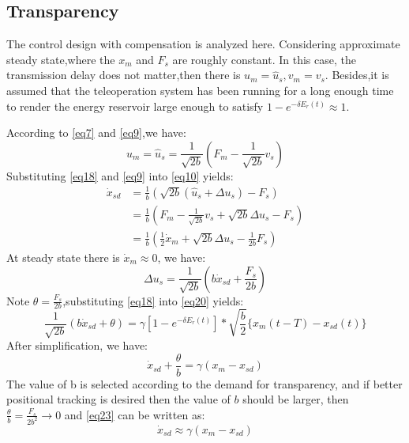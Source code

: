 \subsection{Transparency}
The control design with compensation is analyzed here.
Considering approximate steady state,where the $x_m$ and $F_s$ are roughly constant.
In this case, the transmission delay does not matter,then there is ${{u}_{m}}={{\hat{u}}_{s}},{{v}_{m}}={{v}_{s}}$.
Besides,it is assumed that the teleoperation system has been running for a long enough time
to render the energy reservoir large enough to satisfy $1-{{e}^{-\delta {{E}_{r}}(t)}}\approx 1$.
\par According to \eqref{eq7} and \eqref{eq9},we have:
\begin{equation}
    {{u}_{m}}={{\hat{u}}_{s}}=\frac{1}{\sqrt{2b}}
    \left( {{F}_{m}}-\frac{1}{\sqrt{2b}}{{v}_{s}} \right)
    \label{eq21}
\end{equation}
Substituting \eqref{eq18} and \eqref{eq9} into \eqref{eq10} yields:
$$\begin{aligned}
        \dot{x}_{sd} & =\frac{1}{b}(\sqrt{2b}(\hat{u}_{s}+\Delta u_{s})-F_{s})                      \\
                     & =\frac{1}{b}(F_{m}-\frac{1}{\sqrt{2b}}v_{s}+\sqrt{2b}\Delta u_{s}-F_{s})     \\
                     & =\frac{1}{b}(\frac{1}{2}\dot{x}_{m}+\sqrt{2b}\Delta u_{s}-\frac{1}{2b}F_{s})
    \end{aligned}$$
At steady state there is $\dot x_m \approx 0$, we have:
\begin{equation}
    \Delta {{u}_{s}}=\frac{1}{\sqrt{2b}}(b{{\dot{x}}_{sd}}+\frac{{{F}_{s}}}{2b})
    \label{eq22}
\end{equation}
Note $\theta = \frac{{{F}_{s}}}{2b}$,substituting \eqref{eq18} into \eqref{eq20} yields:
$$\frac{1}{\sqrt{2b}}(b{{\dot{x}}_{sd}}+\theta )=\gamma
    \left[ 1-{{e}^{-\delta {{E}_{r}}(t)}} \right]*\sqrt{\frac{b}{2}}\{{{x}_{m}}(t-T)-{{x}_{sd}}(t)\}$$
After simplification, we have:
\begin{equation}
    {{\dot{x}}_{sd}}+\frac{\theta }{b}=\gamma \left( {{x}_{m}}-{{x}_{sd}} \right)
    \label{eq23}
\end{equation}
The value of b is selected according to the demand for transparency,
and if better positional tracking is desired then the value of $b$ should be larger,
then $\frac{\theta }{b}=\frac{{{F}_{s}}}{2{{b}^{2}}}\to 0$ and \eqref{eq23} can be written as:
\begin{equation}
    {{\dot{x}}_{sd}}\approx \gamma \left( {{x}_{m}}-{{x}_{sd}} \right)
    \label{eq24}
\end{equation}
